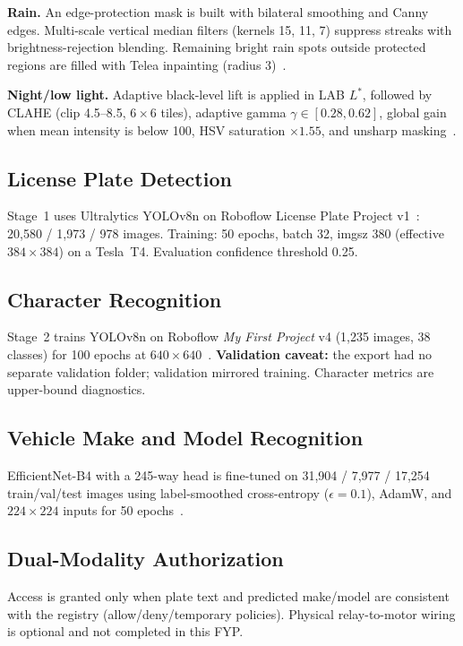 \documentclass[10pt, conference]{IEEEtran}
\begin{document}
\textbf{Rain.} An edge-protection mask is built with bilateral smoothing and Canny edges. Multi-scale vertical median filters (kernels 15, 11, 7) suppress streaks with brightness-rejection blending. Remaining bright rain spots outside protected regions are filled with Telea inpainting (radius 3)~\cite{telea2004}.

\textbf{Night/low light.} Adaptive black-level lift is applied in LAB $L^\ast$, followed by CLAHE (clip 4.5--8.5, $6\times6$ tiles), adaptive gamma $\gamma\in[0.28,0.62]$, global gain when mean intensity is below 100, HSV saturation $\times1.55$, and unsharp masking~\cite{zuiderveld1994clahe}.

\subsection{License Plate Detection}
Stage~1 uses Ultralytics YOLOv8n on Roboflow License Plate Project v1~\cite{roboflowLPD,ultralytics2023yolov8}: 20{,}580 / 1{,}973 / 978 images. Training: 50 epochs, batch 32, imgsz 380 (effective $384\times384$) on a Tesla~T4. Evaluation confidence threshold 0.25.

\subsection{Character Recognition}
Stage~2 trains YOLOv8n on Roboflow \emph{My First Project} v4 (1{,}235 images, 38 classes) for 100 epochs at $640\times640$~\cite{roboflowChars}. \textbf{Validation caveat:} the export had no separate validation folder; validation mirrored training. Character metrics are upper-bound diagnostics.

\subsection{Vehicle Make and Model Recognition}
EfficientNet-B4 with a 245-way head is fine-tuned on 31{,}904 / 7{,}977 / 17{,}254 train/val/test images using label-smoothed cross-entropy ($\epsilon=0.1$), AdamW, and $224\times224$ inputs for 50 epochs~\cite{tan2019efficientnet}.

\subsection{Dual-Modality Authorization}
Access is granted only when plate text and predicted make/model are consistent with the registry (allow/deny/temporary policies). Physical relay-to-motor wiring is optional and not completed in this FYP.
\end{document}
